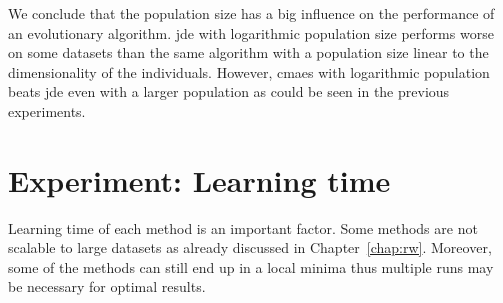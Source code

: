 We conclude that the population size has a big influence on the performance of an evolutionary algorithm. \ac{jde} with logarithmic population size performs worse on some datasets than the same algorithm with a population size linear to the dimensionality of the individuals. However, \ac{cmaes} with logarithmic population beats \ac{jde} even with a larger population as could be seen in the previous experiments.


\section{Experiment: Learning time} \label{chap:exp:learning-times}

Learning time of each method is an important factor. Some methods are not scalable to large datasets as already discussed in Chapter~\ref{chap:rw}. Moreover, some of the methods can still end up in a local minima thus multiple runs may be necessary for optimal results.


